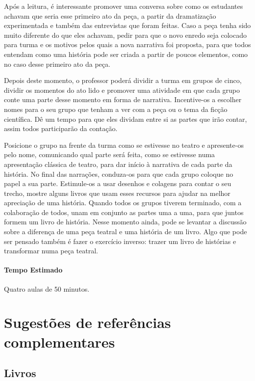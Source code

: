 \documentclass[11pt]{extarticle}
\begin{document}
Após a leitura, é interessante promover uma conversa sobre como os estudantes achavam que seria esse primeiro ato da peça, a partir da dramatização experimentada e também das entrevistas que foram feitas. Caso a peça tenha sido muito diferente do que eles achavam, pedir para que o novo enredo seja colocado para turma e os motivos pelos quais a nova narrativa foi proposta, para que todos entendam como uma história pode ser criada a partir de poucos elementos, como no caso desse primeiro ato da peça.

Depois deste momento, o professor poderá dividir a turma em grupos de cinco, dividir os momentos do ato lido e promover uma atividade em que cada grupo conte uma parte desse momento em forma de narrativa. Incentive-os a escolher nomes para o seu grupo que tenham a ver com a peça ou o tema da ficção científica. Dê um tempo para que eles dividam entre si as partes que irão contar, assim todos participarão da contação.

Posicione o grupo na frente da turma como se estivesse no teatro e apresente-os pelo nome, comunicando qual parte será feita, como se estivesse numa apresentação clássica de teatro, para dar início à narrativa de cada parte da história. No final das narrações, conduza-os para que cada grupo coloque no papel a sua parte. Estimule-os a usar desenhos e colagens para contar o seu trecho, mostre alguns livros que usam esses recursos para ajudar na melhor apreciação de uma história. Quando todos os grupos tiverem terminado, com a colaboração de todos, unam em conjunto as partes uma a uma, para que juntos formem um livro de história. Nesse momento ainda, pode se levantar a discussão sobre a diferença de uma peça teatral e uma história de um livro. Algo que pode ser pensado também é fazer o exercício inverso: trazer um livro de histórias e transformar numa peça teatral. 

\paragraph{Tempo Estimado} Quatro aulas de 50 minutos.   


\section{Sugestões de referências complementares}

\subsection{Livros} 
\end{document}
